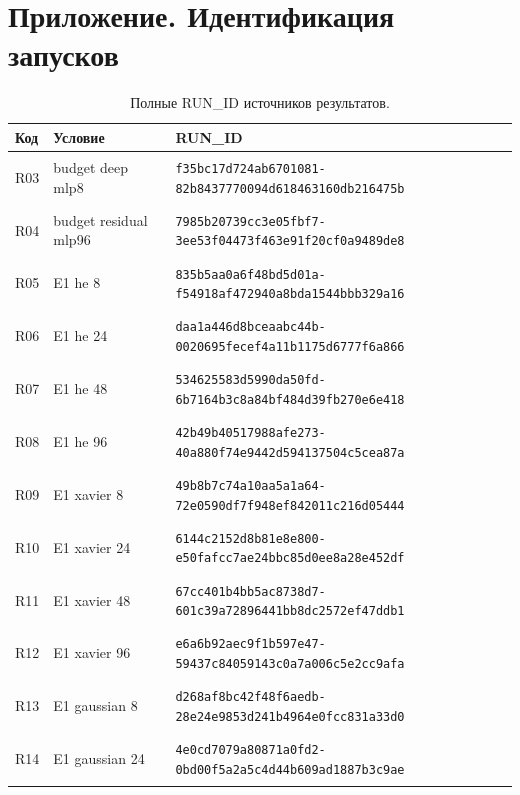\section*{Приложение. Идентификация запусков}
\begingroup\small{}
\begin{longtable}{@{}l>{\raggedright\arraybackslash}p{3.5cm}p{10.8cm}@{}}
\caption{Полные RUN\_ID источников результатов.}\\
\toprule Код & Условие & RUN\_ID \\ \midrule \endhead
\hypertarget{R03}{R03} & budget deep mlp8 & {\fontsize{8.8}{11}\selectfont\texttt{f35bc17d724ab6701081-82b8437770094d618463160db216475b}} \\
\hypertarget{R04}{R04} & budget residual mlp96 & {\fontsize{8.8}{11}\selectfont\texttt{7985b20739cc3e05fbf7-3ee53f04473f463e91f20cf0a9489de8}} \\
\hypertarget{R05}{R05} & E1 he 8 & {\fontsize{8.8}{11}\selectfont\texttt{835b5aa0a6f48bd5d01a-f54918af472940a8bda1544bbb329a16}} \\
\hypertarget{R06}{R06} & E1 he 24 & {\fontsize{8.8}{11}\selectfont\texttt{daa1a446d8bceaabc44b-0020695fecef4a11b1175d6777f6a866}} \\
\hypertarget{R07}{R07} & E1 he 48 & {\fontsize{8.8}{11}\selectfont\texttt{534625583d5990da50fd-6b7164b3c8a84bf484d39fb270e6e418}} \\
\hypertarget{R08}{R08} & E1 he 96 & {\fontsize{8.8}{11}\selectfont\texttt{42b49b40517988afe273-40a880f74e9442d594137504c5cea87a}} \\
\hypertarget{R09}{R09} & E1 xavier 8 & {\fontsize{8.8}{11}\selectfont\texttt{49b8b7c74a10aa5a1a64-72e0590df7f948ef842011c216d05444}} \\
\hypertarget{R10}{R10} & E1 xavier 24 & {\fontsize{8.8}{11}\selectfont\texttt{6144c2152d8b81e8e800-e50fafcc7ae24bbc85d0ee8a28e452df}} \\
\hypertarget{R11}{R11} & E1 xavier 48 & {\fontsize{8.8}{11}\selectfont\texttt{67cc401b4bb5ac8738d7-601c39a72896441bb8dc2572ef47ddb1}} \\
\hypertarget{R12}{R12} & E1 xavier 96 & {\fontsize{8.8}{11}\selectfont\texttt{e6a6b92aec9f1b597e47-59437c84059143c0a7a006c5e2cc9afa}} \\
\hypertarget{R13}{R13} & E1 gaussian 8 & {\fontsize{8.8}{11}\selectfont\texttt{d268af8bc42f48f6aedb-28e24e9853d241b4964e0fcc831a33d0}} \\
\hypertarget{R14}{R14} & E1 gaussian 24 & {\fontsize{8.8}{11}\selectfont\texttt{4e0cd7079a80871a0fd2-0bd00f5a2a5c4d44b609ad1887b3c9ae}} \\

\end{longtable}
